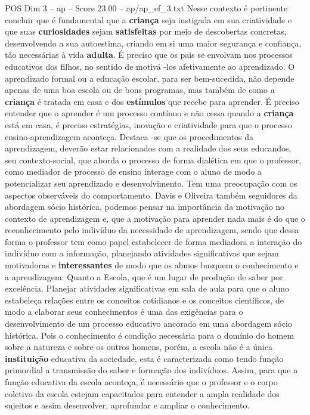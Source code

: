\begin{textsample}{POS Dim 3 – ap – Score 23.00 – ap/ap\_ef\_3.txt}
Nesse contexto é pertinente concluir que é fundamental que a \textbf{criança} seja instigada em sua criatividade e que suas \textbf{curiosidades} sejam \textbf{satisfeitas} por meio de descobertas concretas, desenvolvendo a sua autoestima, criando em si uma maior segurança e confiança, tão necessárias à vida \textbf{adulta}.
É preciso que os pais se envolvam nos processos educativos dos filhos, no sentido de motivá -los afetivamente ao aprendizado.
O aprendizado formal ou a educação escolar, para ser bem-sucedida, não depende apenas de uma boa escola ou de bons programas, mas também de como a \textbf{criança} é tratada em casa e dos \textbf{estímulos} que recebe para aprender.
É preciso entender que o aprender é um processo contínuo e não cessa quando a \textbf{criança} está em casa, é preciso estratégias, inovação e criatividade para que o processo ensino-aprendizagem aconteça.
Destaca -se que os procedimentos da aprendizagem, deverão estar relacionados com a realidade dos seus educandos, seu contexto-social, que aborda o processo de forma dialética em que o professor, como mediador de processo de ensino interage com o aluno de modo a potencializar seu aprendizado e desenvolvimento.
Tem uma preocupação com os aspectos observáveis do comportamento.
Davis e Oliveira também seguidores da abordagem sócio histórica, podemos pensar na importância da motivação no contexto de aprendizagem e, que a motivação para aprender nada mais é do que o reconhecimento pelo indivíduo da necessidade de aprendizagem, sendo que dessa forma o professor tem como papel estabelecer de forma mediadora a interação do indivíduo com a informação, planejando atividades significativas que sejam motivadoras e \textbf{interessantes} de modo que os alunos busquem o conhecimento e a aprendizagem.
Quanto a Escola, que é um lugar de produção de saber por excelência.
Planejar atividades significativas em sala de aula para que o aluno estabeleça relações entre os conceitos cotidianos e os conceitos científicos, de modo a elaborar seus conhecimentos é uma das exigências para o desenvolvimento de um processo educativo ancorado em uma abordagem sócio histórica.
Pois o conhecimento é condição necessária para o domínio do homem sobre a natureza e sobre os outros homens, porém, a escola não é a única \textbf{instituição} educativa da sociedade, esta é caracterizada como tendo função primordial a transmissão do saber e formação dos indivíduos.
Assim, para que a função educativa da escola aconteça, é necessário que o professor e o corpo coletivo da escola estejam capacitados para entender a ampla realidade dos sujeitos e assim desenvolver, aprofundar e ampliar o conhecimento.

\end{textsample}
